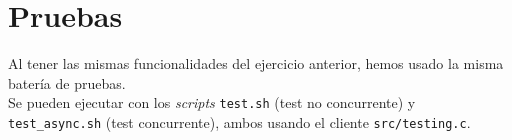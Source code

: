 \section{Pruebas}
Al tener las mismas funcionalidades del ejercicio anterior, hemos usado la misma batería de pruebas.\\
Se pueden ejecutar con los \textit{scripts} \texttt{test.sh} (test no concurrente) y \texttt{test\_async.sh} (test concurrente), ambos usando el cliente \texttt{src/testing.c}.
